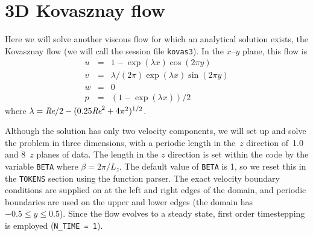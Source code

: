 \documentclass[11pt]{report}
\def\Rey{\mbox{\it Re}}                             %
\begin{document}
\section{3D Kovasznay flow}
\label{sec.kovas}

Here we will solve another viscous flow for which an analytical
solution exists, the Kovasznay flow (we will call the session file
\verb+kovas3+).  In the $x$--$y$ plane, this flow is
\begin{eqnarray}
        u &=& 1 - \exp(\lambda x)\cos(2\pi y)           \\
        v &=& \lambda/(2\pi)\exp(\lambda x)\sin(2\pi y) \\
        w &=& 0                                         \\
        p &=& (1 - \exp(\lambda x))/2   
\end{eqnarray}
where $\lambda = \Rey/2 - (0.25\Rey^2 + 4\pi^2)^{1/2}$.

Although the solution has only two velocity components, we will set up
and solve the problem in three dimensions, with a periodic length in
the~$z$ direction of~1.0 and 8~$z$ planes of data.  The length in the
$z$ direction is set within the code by the variable \verb+BETA+ where
$\beta=2\pi/L_z$.  The default value of \verb+BETA+ is 1, so we reset
this in the \texttt{TOKENS} section using the function parser.  The
exact velocity boundary conditions are supplied on at the left and
right edges of the domain, and periodic boundaries are used on the
upper and lower edges (the domain has $-0.5\le y\le0.5$).  Since the
flow evolves to a steady state, first order timestepping is employed
(\verb+N_TIME = 1+).
\end{document}
